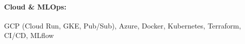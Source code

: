 \documentclass[10pt, letterpaper]{article}
\newenvironment{highlights}{
    \begin{itemize}[
        topsep=0.10 cm,
        parsep=0.10 cm,
        partopsep=0pt,
        itemsep=0pt,
        leftmargin=0 cm + 10pt
    ]
}{
    \end{itemize}
} %
\newenvironment{onecolentry}{
    \begin{adjustwidth}{
        0 cm + 0.00001 cm
    }{
        0 cm + 0.00001 cm
    }
}{
    \end{adjustwidth}
} %
\begin{document}
        \paragraph{Cloud \& MLOps:} GCP (Cloud Run, GKE, Pub/Sub), Azure, Docker, Kubernetes, Terraform, CI/CD, MLflow

    
        



    
    
    


    
\end{document}
